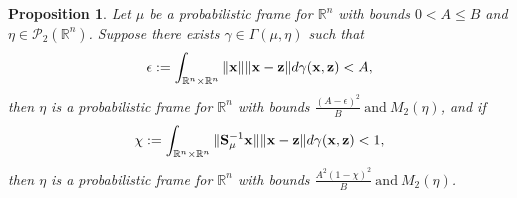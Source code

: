 \documentclass[10pt,a4paper]{amsart}
\newtheorem{proposition}{Proposition}
\begin{document}
\begin{proposition}\label{CoulingDualPerturbation}
Let $\mu$ be a probabilistic frame for $\mathbb{R}^n$ with bounds $0<A \leq B$ and $\eta \in \mathcal{P}_2(\mathbb{R}^n)$. Suppose there exists $\gamma \in \Gamma(\mu, \eta)$ such that
\begin{equation*}
   \epsilon:= \int_{\mathbb{R}^n \times \mathbb{R}^n}  \Vert {\bf x}\Vert  \Vert {\bf x}-{\bf z} \Vert  d \gamma({\bf x},{\bf z})<A,
\end{equation*}
then $\eta$ is a probabilistic frame for $\mathbb{R}^n$ with bounds $\frac{(A- \epsilon)^2}{B} \ \text{and} \ M_2(\eta)$,
and if 
\begin{equation*}
   \chi := \int_{\mathbb{R}^n \times \mathbb{R}^n} \Vert {\bf S}_\mu^{-1} {\bf x}\Vert   \Vert {\bf x}-{\bf z} \Vert  d \gamma({\bf x},{\bf z})<1,
\end{equation*}
then $\eta$ is a probabilistic frame for $\mathbb{R}^n$ with bounds $\frac{A^2 (1-\chi)^2}{B} \ \text{and} \ M_2(\eta)$.
\end{proposition}
\end{document}
